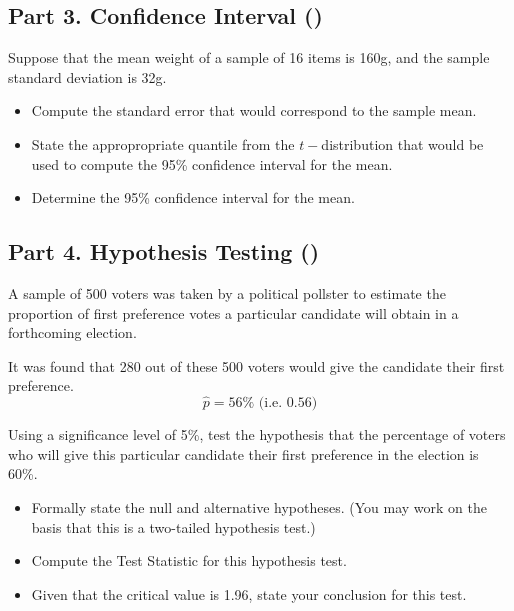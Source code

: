 \newpage
\subsection*{Part 3. Confidence Interval ()}

Suppose that the mean weight of a sample of 16 items is 160g, and the sample standard deviation is 32g.



\begin{itemize}

 \item  Compute the standard error that would correspond to the sample mean.

 \item  State the appropropriate quantile from the $t-$distribution that would be used to compute the 95\% confidence interval for the mean.

 \item  Determine the 95\% confidence interval for the mean.
\end{itemize}

\subsection*{Part 4. Hypothesis Testing ()}

\noindent A sample of 500 voters was taken by a political pollster to estimate the proportion of first preference votes a particular candidate will obtain in a forthcoming election. \\
\bigskip

\noindent It was found that 280 out of these 500 voters would give the candidate their first preference.
\[\hat{p} = 56\%  \mbox{    (i.e.  } 0.56)\]

\vspace{0.4cm}
\noindent
Using a significance level of 5\%, test the hypothesis that the percentage of voters who will give this particular candidate their first preference in the election is 60\%.\\


\begin{itemize}

 \item  Formally state the null and alternative hypotheses. (You may work on the basis that this is a two-tailed hypothesis test.)


 \item  Compute the Test Statistic for this hypothesis test.

 \item  Given that the critical value is 1.96, state your conclusion for this test.
\end{itemize}
\newpage




